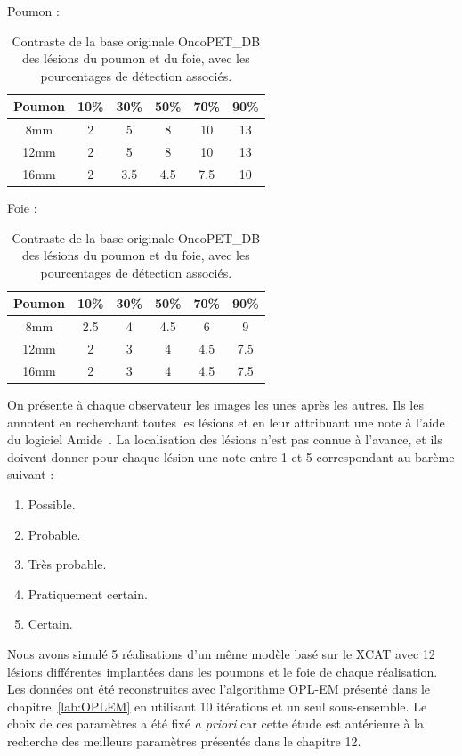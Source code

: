 \begin{table}
\centering
Poumon :\\
\begin{tabular}{|c||c|c|c|c|c|}
 \hline
Poumon	& 10\% & 30\% & 50\% & 70\% & 90\% \\
\hline
8mm	& 2    &  5   &  8   & 10   & 13   \\
\hline
12mm    & 2    &  5   &  8   & 10   & 13   \\
\hline
16mm    & 2    &  3.5 &  4.5 & 7.5  & 10   \\
\hline
\end{tabular}

\vspace{0.5cm}

Foie :\\
\begin{tabular}{|c||c|c|c|c|c|}
 \hline
Poumon	& 10\% & 30\% & 50\% & 70\% & 90\% \\
\hline
8mm	& 2.5    &  4   &  4.5   & 6   & 9   \\
\hline
12mm    & 2    &  3   &  4   & 4.5   & 7.5   \\
\hline
16mm    & 2    &  3   &  4   & 4.5   & 7.5   \\
\hline
\end{tabular}
\caption[Contraste de la base originale OncoPET\_DB des lésions du poumon et du foie pour l'étude de détectabilité]{Contraste de la base originale OncoPET\_DB des lésions du poumon et du foie, avec les pourcentages de détection associés.}
\label{fig:contrtasteFoiePoumonOrig}
\end{table}


On présente à chaque observateur les images les unes après les autres. Ils les annotent en recherchant toutes les lésions et en leur attribuant une note à l'aide du logiciel Amide~\cite{loening2003amide}. La localisation des lésions n'est pas connue à l'avance, et ils doivent donner pour chaque lésion une note entre 1 et 5 correspondant au barème suivant :

\begin{enumerate}
\item Possible.
\item Probable.
\item Très probable.
\item Pratiquement certain.
\item Certain.
\end{enumerate}

Nous avons simulé 5 réalisations d'un même modèle basé sur le XCAT avec 12 lésions différentes implantées dans les poumons et le foie de chaque réalisation. Les données ont été reconstruites avec l'algorithme OPL-EM présenté dans le chapitre~\ref{lab:OPLEM} en utilisant 10 itérations et un seul sous-ensemble. Le choix de ces paramètres a été fixé \textit{a priori} car cette étude est antérieure à la recherche des meilleurs paramètres présentés dans le chapitre 12.

